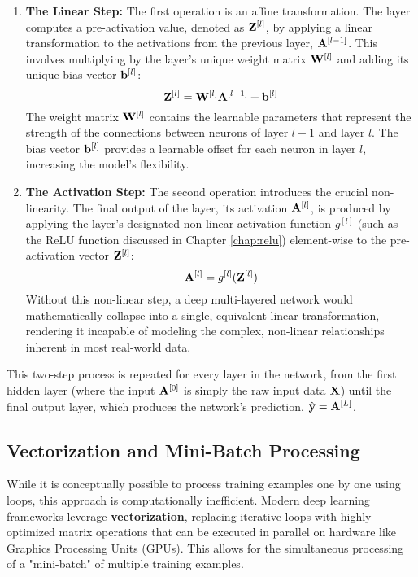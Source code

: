 \begin{enumerate}
    \item \textbf{The Linear Step:} The first operation is an affine transformation. The layer computes a pre-activation value, denoted as $\mathbf{Z}^{[l]}$, by applying a linear transformation to the activations from the previous layer, $\mathbf{A}^{[l-1]}$. This involves multiplying by the layer's unique weight matrix $\mathbf{W}^{[l]}$ and adding its unique bias vector $\mathbf{b}^{[l]}$:
    \begin{equation}
    \mathbf{Z}^{[l]} = \mathbf{W}^{[l]}\mathbf{A}^{[l-1]} + \mathbf{b}^{[l]}
    \label{eq:linear_step}
    \end{equation}
    The weight matrix $\mathbf{W}^{[l]}$ contains the learnable parameters that represent the strength of the connections between neurons of layer $l-1$ and layer $l$. The bias vector $\mathbf{b}^{[l]}$ provides a learnable offset for each neuron in layer $l$, increasing the model's flexibility.

    \item \textbf{The Activation Step:} The second operation introduces the crucial non-linearity. The final output of the layer, its activation $\mathbf{A}^{[l]}$, is produced by applying the layer's designated non-linear activation function $g^{[l]}$ (such as the ReLU function discussed in Chapter \ref{chap:relu}) element-wise to the pre-activation vector $\mathbf{Z}^{[l]}$:
    \begin{equation}
    \mathbf{A}^{[l]} = g^{[l]}(\mathbf{Z}^{[l]})
    \label{eq:activation_step}
    \end{equation}
    Without this non-linear step, a deep multi-layered network would mathematically collapse into a single, equivalent linear transformation, rendering it incapable of modeling the complex, non-linear relationships inherent in most real-world data.
\end{enumerate}
This two-step process is repeated for every layer in the network, from the first hidden layer (where the input $\mathbf{A}^{[0]}$ is simply the raw input data $\mathbf{X}$) until the final output layer, which produces the network's prediction, $\hat{\mathbf{y}} = \mathbf{A}^{[L]}$.

\subsection{Vectorization and Mini-Batch Processing}
While it is conceptually possible to process training examples one by one using loops, this approach is computationally inefficient. Modern deep learning frameworks leverage \textbf{vectorization}, replacing iterative loops with highly optimized matrix operations that can be executed in parallel on hardware like Graphics Processing Units (GPUs). This allows for the simultaneous processing of a "mini-batch" of multiple training examples.

